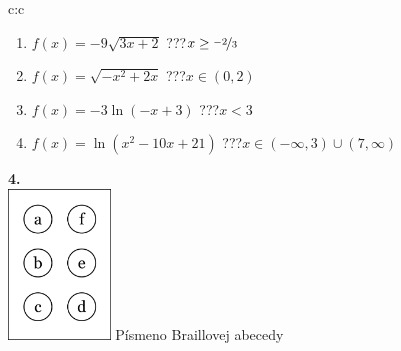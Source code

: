 \documentclass[10pt]{report}
\begin{document}
\begin{tabular}{c:c}
\begin{minipage}[c][99mm][t]{0.49\linewidth}
\begin{center}
\begin{minipage}{0.77\linewidth}
\begin{center}
\begin{varwidth}{\textwidth}
\begin{enumerate}
\item $f(x)=-9\sqrt{3x+2}$\quad \dotfill\; ???\;\dotfill \quad $x\geq\nicefrac{-2}{3}$
\item $f(x)=\sqrt{-x^2+2x}$\quad \dotfill\; ???\;\dotfill \quad $x\in(0 , 2)$
\item $f(x)=-3\ln{(-x+3)}$\quad \dotfill\; ???\;\dotfill \quad $x<3$
\item $f(x)=\ln{(x^2-10x+21)}$\quad \dotfill\; ???\;\dotfill \quad $x\in(-\infty , 3)\cup(7 , \infty)$
\end{enumerate}
\end{varwidth}
\end{center}
\end{minipage}
\begin{minipage}{0.20\linewidth}
\begin{center}
{\Huge\bfseries 4.} \\[2mm]
\includegraphics[height=40mm]{../images/braille.png}
{\small Písmeno Braillovej abecedy}
\end{center}
\end{minipage}
\end{center}
\end{minipage}
%
\end{tabular}
\newpage
\thispagestyle{empty}
\end{document}
